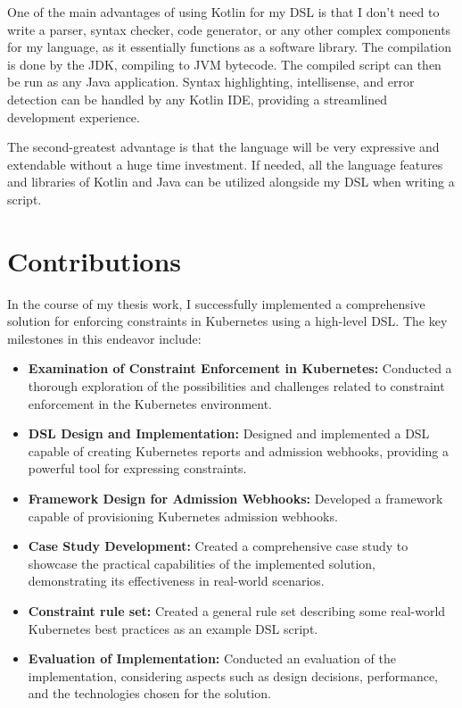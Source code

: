 One of the main advantages of using Kotlin for my DSL is that I don't need to write a parser, syntax checker, code generator, or any other complex components for my language, as it essentially functions as a software library. The compilation is done by the JDK, compiling to JVM bytecode. The compiled script can then be run as any Java application. Syntax highlighting, intellisense, and error detection can be handled by any Kotlin IDE, providing a streamlined development experience.

The second-greatest advantage is that the language will be very expressive and extendable without a huge time investment. If needed, all the language features and libraries of Kotlin and Java can be utilized alongside my DSL when writing a script.

\section{Contributions}

In the course of my thesis work, I successfully implemented a comprehensive solution for enforcing constraints in Kubernetes using a high-level DSL. The key milestones in this endeavor include:

\begin{itemize}
    \item \textbf{Examination of Constraint Enforcement in Kubernetes:} Conducted a thorough exploration of the possibilities and challenges related to constraint enforcement in the Kubernetes environment.
    \item \textbf{DSL Design and Implementation:} Designed and implemented a DSL capable of creating Kubernetes reports and admission webhooks, providing a powerful tool for expressing constraints.
    \item \textbf{Framework Design for Admission Webhooks:} Developed a framework capable of provisioning Kubernetes admission webhooks.
    \item \textbf{Case Study Development:} Created a comprehensive case study to showcase the practical capabilities of the implemented solution, demonstrating its effectiveness in real-world scenarios.
    \item \textbf{Constraint rule set:} Created a general rule set describing some real-world Kubernetes best practices as an example DSL script.
    \item \textbf{Evaluation of Implementation:} Conducted an evaluation of the implementation, considering aspects such as design decisions, performance, and the technologies chosen for the solution.
\end{itemize}

